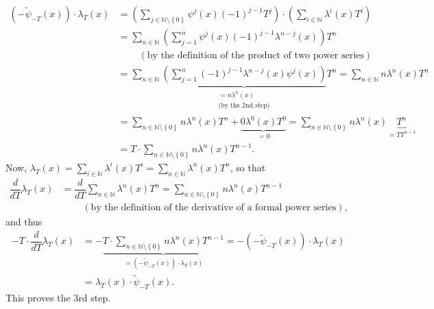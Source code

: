 \documentclass[numbers=enddot,12pt,final,onecolumn,notitlepage]{scrartcl}%
\begin{document}
\begin{align*}
\left(  -\widetilde{\psi}_{-T}\left(  x\right)  \right)  \cdot\lambda
_{T}\left(  x\right)   &  =\left(  \sum\limits_{j\in\mathbb{N}\setminus
\left\{  0\right\}  }\psi^{j}\left(  x\right)  \left(  -1\right)  ^{j-1}%
T^{j}\right)  \cdot\left(  \sum\limits_{i\in\mathbb{N}}\lambda^{i}\left(
x\right)  T^{i}\right) \\
&  =\sum_{n\in\mathbb{N}}\left(  \sum_{j=1}^{n}\psi^{j}\left(  x\right)
\left(  -1\right)  ^{j-1}\lambda^{n-j}\left(  x\right)  \right)  T^{n}\\
&  \ \ \ \ \ \ \ \ \ \ \left(  \text{by the definition of the product of two
power series}\right) \\
&  =\sum_{n\in\mathbb{N}}\underbrace{\left(  \sum_{j=1}^{n}\left(  -1\right)
^{j-1}\lambda^{n-j}\left(  x\right)  \psi^{j}\left(  x\right)  \right)
}_{\substack{=n\lambda^{n}\left(  x\right)  \\\text{(by the 2nd step)}}%
}T^{n}=\sum_{n\in\mathbb{N}}n\lambda^{n}\left(  x\right)  T^{n}\\
&  =\sum_{n\in\mathbb{N}\setminus\left\{  0\right\}  }n\lambda^{n}\left(
x\right)  T^{n}+\underbrace{0\lambda^{0}\left(  x\right)  T^{0}}_{=0}%
=\sum_{n\in\mathbb{N}\setminus\left\{  0\right\}  }n\lambda^{n}\left(
x\right)  \underbrace{T^{n}}_{=TT^{n-1}}\\
&  =T\cdot\sum_{n\in\mathbb{N}\setminus\left\{  0\right\}  }n\lambda
^{n}\left(  x\right)  T^{n-1}.
\end{align*}
Now, $\lambda_{T}\left(  x\right)  =\sum\limits_{i\in\mathbb{N}}\lambda
^{i}\left(  x\right)  T^{i}=\sum\limits_{n\in\mathbb{N}}\lambda^{n}\left(
x\right)  T^{n}$, so that%
\begin{align*}
\dfrac{d}{dT}\lambda_{T}\left(  x\right)   &  =\dfrac{d}{dT}\sum
\limits_{n\in\mathbb{N}}\lambda^{n}\left(  x\right)  T^{n}=\sum_{n\in
\mathbb{N}\setminus\left\{  0\right\}  }n\lambda^{n}\left(  x\right)
T^{n-1}\\
&  \ \ \ \ \ \ \ \ \ \ \left(  \text{by the definition of the derivative of a
formal power series}\right)  ,
\end{align*}
and thus%
\begin{align*}
-T\cdot\dfrac{d}{dT}\lambda_{T}\left(  x\right)   &  =-\underbrace{T\cdot
\sum_{n\in\mathbb{N}\setminus\left\{  0\right\}  }n\lambda^{n}\left(
x\right)  T^{n-1}}_{=\left(  -\widetilde{\psi}_{-T}\left(  x\right)  \right)
\cdot\lambda_{T}\left(  x\right)  }=-\left(  -\widetilde{\psi}_{-T}\left(
x\right)  \right)  \cdot\lambda_{T}\left(  x\right) \\
&  =\lambda_{T}\left(  x\right)  \cdot\widetilde{\psi}_{-T}\left(  x\right)  .
\end{align*}
This proves the 3rd step.
\end{document}

